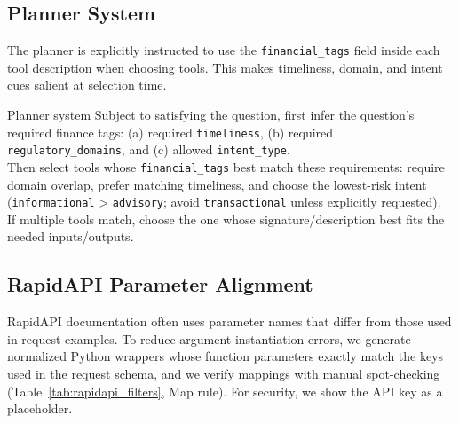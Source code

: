 \subsection{Planner System}

The planner is explicitly instructed to use the \texttt{financial\_tags} field inside each tool description when choosing tools.
This makes timeliness, domain, and intent cues salient at selection time.

\begin{promptcard}{Planner system}
Subject to satisfying the question, first infer the question’s required finance tags:
(a) required \texttt{timeliness}, (b) required \texttt{regulatory\_domains}, and (c) allowed \texttt{intent\_type}.\\
Then select tools whose \texttt{financial\_tags} best match these requirements: require domain overlap, prefer matching timeliness, and choose the lowest-risk intent (\texttt{informational} > \texttt{advisory}; avoid \texttt{transactional} unless explicitly requested).\\
If multiple tools match, choose the one whose signature/description best fits the needed inputs/outputs.
\end{promptcard}

\subsection{RapidAPI Parameter Alignment}

RapidAPI documentation often uses parameter names that differ from those used in request examples.
To reduce argument instantiation errors, we generate normalized Python wrappers whose function parameters exactly match the keys used in the request schema, and we verify mappings with manual spot-checking (Table~\ref{tab:rapidapi_filters}, Map rule).
For security, we show the API key as a placeholder.

